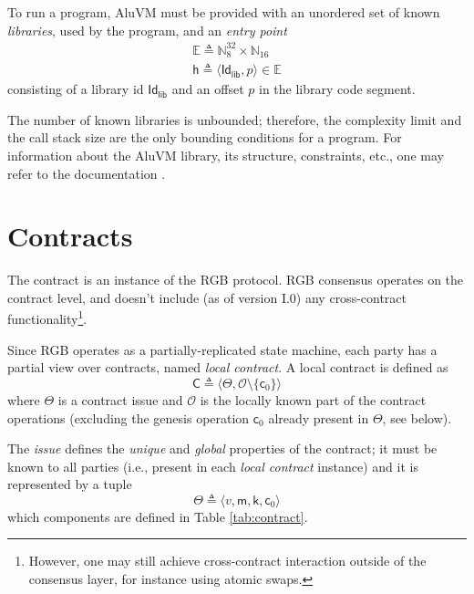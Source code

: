 \documentclass[9pt,oneside]{amsart}
\begin{document}
\begin{multicols}{2}
To run a program, AluVM must be provided with an unordered set of known \emph{libraries},
used by the program, and an \emph{entry point}
\noindent
\begin{gather}\label{eq:e}
\mathbb{E} \triangleq \mathbb{N}^{32}_8 \times \mathbb{N}_{16} \\
\mathsf{h} \triangleq \langle \mathsf{Id_{lib}}, p \rangle \in \mathbb{E}
\end{gather}
\noindent
consisting of a library id $\mathsf{Id_{lib}}$ and an offset $p$ in the library code segment.

The number of known libraries is unbounded; therefore, the complexity limit and the call stack size
are the only bounding conditions for a program.
For information about the AluVM library, its structure, constraints, etc., one may refer to the
documentation \cite{AluVM}.

\section{Contracts}\label{Contracts}

The contract is an instance of the RGB protocol. RGB consensus operates on the contract level,
and doesn't include (as of version I.0) any cross-contract functionality\footnote{%
    However, one may still achieve cross-contract interaction outside of the consensus layer,
    for instance using atomic swaps.}.

Since RGB operates as a partially-replicated state machine,
each party has a partial view over contracts, named \emph{local contract}.
A local contract is defined as
\noindent
\begin{equation}
\mathsf{C} \triangleq \langle \mathsf{\Theta}, \mathcal{O} \setminus \{ \mathsf{c}_0 \} \rangle
\end{equation}
\noindent
where $\Theta$ is a contract issue and
$\mathcal{O}$ is the locally known part of the contract operations
(excluding the genesis operation $\mathsf{c}_0$ already present in $\Theta$, see below).

The \emph{issue} defines the \emph{unique} and \emph{global} properties of the contract;
it must be known to all parties (i.e., present in each \emph{local contract} instance) and
it is represented by a tuple
\noindent
\begin{equation}\label{eq:issue}
\mathsf{\Theta} \triangleq \langle v, \mathsf{m}, \mathsf{k}, \mathsf{c}_0 \rangle
\end{equation}
\noindent
which components are defined in Table \ref{tab:contract}.

\end{multicols}
\end{document}
